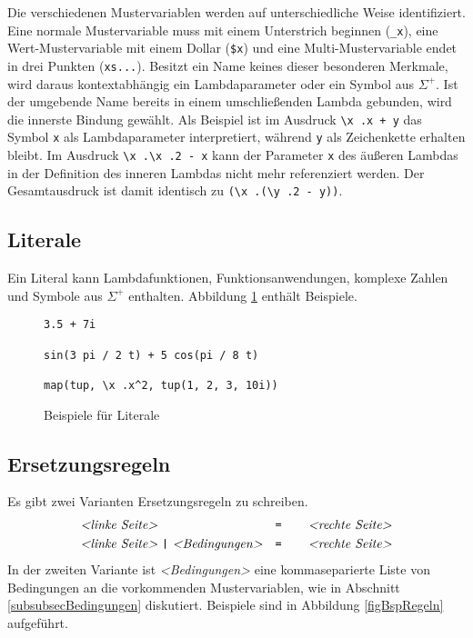 Die verschiedenen Mustervariablen werden auf unterschiedliche Weise identifiziert. Eine normale Mustervariable muss mit einem Unterstrich beginnen (\verb|_x|), eine Wert-Mustervariable mit einem Dollar (\verb|$x|) und eine Multi-Mustervariable endet in drei Punkten (\verb|xs...|). Besitzt ein Name keines dieser besonderen Merkmale, wird daraus kontextabhängig ein Lambdaparameter oder ein Symbol aus $\Sigma^+$. Ist der umgebende Name bereits in einem umschließenden Lambda gebunden, wird die innerste Bindung gewählt. Als Beispiel ist im Ausdruck \verb|\x .x + y| das Symbol \verb|x| als Lambdaparameter interpretiert, während \verb|y| als Zeichenkette erhalten bleibt.
Im Ausdruck \verb|\x .\x .2 - x| kann der Parameter \verb|x| des äußeren Lambdas in der Definition des inneren Lambdas nicht mehr referenziert werden. Der Gesamtausdruck ist damit identisch zu \verb|(\x .(\y .2 - y))|.

\subsection{Literale}
Ein Literal kann Lambdafunktionen, Funktionsanwendungen, komplexe Zahlen und Symbole aus $\Sigma^+$ enthalten. Abbildung \ref{figBspLit} enthält Beispiele.

\begin{figure}
\begin{unbreakable}\begin{verbatim}
3.5 + 7i

sin(3 pi / 2 t) + 5 cos(pi / 8 t)

map(tup, \x .x^2, tup(1, 2, 3, 10i))
\end{verbatim}\end{unbreakable}
\caption{Beispiele für Literale}
\label{figBspLit}
\end{figure}

\subsection{Ersetzungsregeln}
Es gibt zwei Varianten Ersetzungsregeln zu schreiben.
\begin{align*}
	~&~&~&~&\textit{<linke Seite>}&~ ~                       &\verb~=    ~ \textit{<rechte Seite>}&~&~&~&~\\
	~&~&~&~&\textit{<linke Seite>}&~\verb~|~~\textit{<Bedingungen>} &\verb~=    ~ \textit{<rechte Seite>}&~&~&~&~
\end{align*}
In der zweiten Variante ist \textit{<Bedingungen>} eine kommaseparierte Liste von Bedingungen an die vorkommenden Mustervariablen, wie in Abschnitt \ref{subsubsecBedingungen} diskutiert. 
Beispiele sind in Abbildung \ref{figBspRegeln} aufgeführt.

